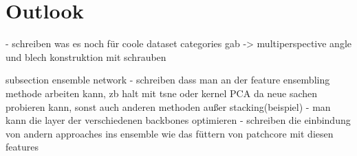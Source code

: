\section{Outlook}
\label{sec:outlook}


- schreiben was es noch für coole dataset categories gab -> multiperspective angle und blech konstruktion mit schrauben

subsection ensemble network
- schreiben dass man an der feature ensembling methode arbeiten kann, zb halt mit tsne oder kernel PCA da neue sachen probieren kann, sonst auch anderen methoden außer stacking(beispiel)
- man kann die layer der verschiedenen backbones optimieren
- schreiben die einbindung von andern approaches ins ensemble wie das füttern von patchcore mit diesen features



